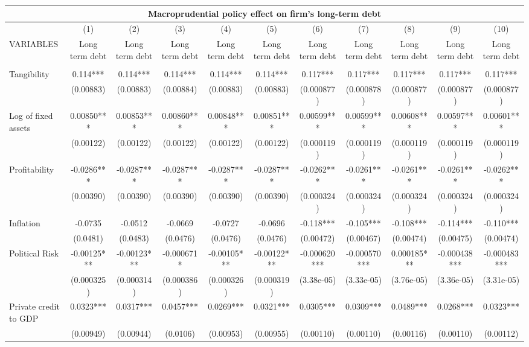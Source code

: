 \begin{tabular}{lcccccccccc}
\multicolumn{11}{c}{Macroprudential policy effect on firm's long-term debt} \\ \hline
 & (1) & (2) & (3) & (4) & (5) & (6) & (7) & (8) & (9) & (10) \\
VARIABLES & Long term debt & Long term debt & Long term debt & Long term debt & Long term debt & Long term debt & Long term debt & Long term debt & Long term debt & Long term debt \\ \hline
 &  &  &  &  &  &  &  &  &  &  \\
Tangibility & 0.114*** & 0.114*** & 0.114*** & 0.114*** & 0.114*** & 0.117*** & 0.117*** & 0.117*** & 0.117*** & 0.117*** \\
 & (0.00883) & (0.00883) & (0.00884) & (0.00883) & (0.00883) & (0.000877) & (0.000878) & (0.000877) & (0.000877) & (0.000877) \\
Log of fixed assets & 0.00850*** & 0.00853*** & 0.00860*** & 0.00848*** & 0.00851*** & 0.00599*** & 0.00599*** & 0.00608*** & 0.00597*** & 0.00601*** \\
 & (0.00122) & (0.00122) & (0.00122) & (0.00122) & (0.00122) & (0.000119) & (0.000119) & (0.000119) & (0.000119) & (0.000119) \\
Profitability & -0.0286*** & -0.0287*** & -0.0287*** & -0.0287*** & -0.0287*** & -0.0262*** & -0.0261*** & -0.0261*** & -0.0261*** & -0.0262*** \\
 & (0.00390) & (0.00390) & (0.00390) & (0.00390) & (0.00390) & (0.000324) & (0.000324) & (0.000324) & (0.000324) & (0.000324) \\
Inflation & -0.0735 & -0.0512 & -0.0669 & -0.0727 & -0.0696 & -0.118*** & -0.105*** & -0.108*** & -0.114*** & -0.110*** \\
 & (0.0481) & (0.0483) & (0.0476) & (0.0476) & (0.0476) & (0.00472) & (0.00467) & (0.00474) & (0.00475) & (0.00474) \\
Political Risk & -0.00125*** & -0.00123*** & -0.000671* & -0.00105*** & -0.00122*** & -0.000620*** & -0.000570*** & 0.000185*** & -0.000438*** & -0.000483*** \\
 & (0.000325) & (0.000314) & (0.000386) & (0.000326) & (0.000319) & (3.38e-05) & (3.33e-05) & (3.76e-05) & (3.36e-05) & (3.31e-05) \\
Private credit to GDP & 0.0323*** & 0.0317*** & 0.0457*** & 0.0269*** & 0.0321*** & 0.0305*** & 0.0309*** & 0.0489*** & 0.0268*** & 0.0323*** \\
 & (0.00949) & (0.00944) & (0.0106) & (0.00953) & (0.00955) & (0.00110) & (0.00110) & (0.00116) & (0.00110) & (0.00112) \\

\end{tabular}
